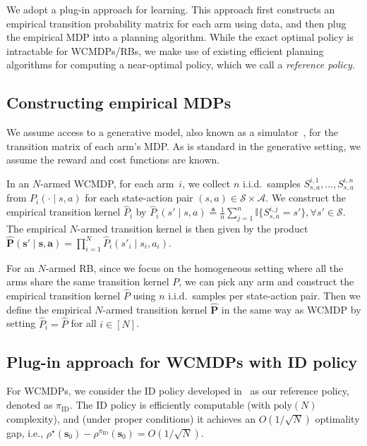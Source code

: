 \documentclass[mnsc,nonblindrev]{informs3}
\newcommand{\bphat}{\widehat{\bm{P}}}
\newcommand{\piid}{\pi_{\mathrm{ID}}}
\newcommand{\bms}{\bm{s}}
\newcommand{\bma}{\bm{a}}
\newcommand{\States}{\mathcal{S}}
\newcommand{\Actions}{\mathcal{A}}
\begin{document}
We adopt a plug-in approach for learning. 
This approach first constructs an empirical transition probability matrix for each arm using data, and then plug the empirical MDP into a planning algorithm. While the exact optimal policy is intractable for WCMDPs/RBs, we make use of existing efficient planning algorithms for computing a near-optimal policy, which we call a \emph{reference policy}.


\subsection{Constructing empirical MDPs}
We assume access to a generative model, also known as a simulator~\citep{kearns_finite-sample_1998}, for the transition matrix of each arm's MDP. As is standard in the generative setting, we assume the reward and cost functions are known.

In an $N$-armed WCMDP, for each arm~$i$, we collect $n$ i.i.d.\ samples $S_{s,a}^{i,1}, \dots, S_{s,a}^{i,n}$ from $P_i(\cdot\mid s,a)$ for each state-action pair $(s,a)\in\States\times\Actions$.
We construct the empirical transition kernel $\widehat{P}_i$ by $
    \widehat{P}_i(s' \mid s, a) \triangleq\frac{1}{n} \sum\nolimits_{j=1}^{n} \mathbb{I}\{S_{s,a}^{i,j} = s'\}, \forall s' \in \States.$
The empirical $N$-armed transition kernel is then given by the product
    $\bphat(\bms'\mid \bms,\bma)=\prod\nolimits_{i=1}^N \widehat{P}_i(s'_i \mid s_i, a_i).$

For an $N$-armed RB, since we focus on the homogeneous setting where all the arms share the same transition kernel $P$, we can pick any arm and construct the empirical transition kernel $\widehat P$ using $n$ i.i.d.\ samples per state-action pair.
Then we define the empirical $N$-armed transition kernel $\bphat$ in the same way as WCMDP by setting $\widehat P_i=\widehat P$ for all $i\in[N]$.

\subsection{Plug-in approach for WCMDPs with ID policy}

For WCMDPs, we consider the ID policy developed in~\citet{zhang2025projection} as our reference policy, denoted as $\piid$.
The ID policy is efficiently computable (with $\text{poly}(N)$ complexity), and (under proper conditions) it achieves an $O(1/\sqrt{N})$ optimality gap, i.e., $\rho^\star(\bms_0)-\rho^{\piid}(\bms_0)=O(1/\sqrt{N})$.
\end{document}
